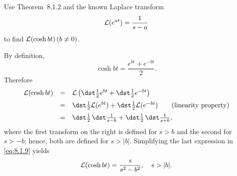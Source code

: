 \setcounter{example}{5}
\begin{example}
  \label{example:8.1.6}\rm Use Theorem~8.1.2 and the known Laplace transform
  \[
    {\cal L}(e^{at})=\frac{1}{s-a}
  \]
  to find ${\cal L}(\cosh bt)\,(b\ne0)$.
\end{example}
\setcounter{equation}{8}
\begin{examplesolution}
\solution By definition,
\[
  \cosh bt=\frac{e^{bt}+e^{-bt}}{2}.
\]
Therefore
\begin{equation}
  \label{eq:8.1.9}
  \begin{array}{ccl}
    {\cal L}(\cosh bt) & = & {\cal L}\left(\dst\frac{1}{2}e^{bt}+\dst\frac{1}{2}e^{-bt}\right)                                   \\[2\jot]
                       & = & \dst\frac{1}{2}{\cal L}(e^{bt})+\dst\frac{1}{2}{\cal L}(e^{-bt}) \qquad \hbox{(linearity property)} \\[2\jot]
                       & = & \dst\frac{1}{2}\,\dst\frac{1}{s-b}+\dst\frac{1}{2}\,\dst\frac{1}{s+b},
  \end{array}
\end{equation}
where the first transform on the right is defined for $s>b$ and the second for $s>-b$; hence, both
are defined for $s>|b|$. Simplifying the last expression in \eqref{eq:8.1.9} yields
\[
  {\cal L}(\cosh bt)=\frac{s}{s^{2}-b^{2}},\quad s>|b|.
\]
\end{examplesolution}

